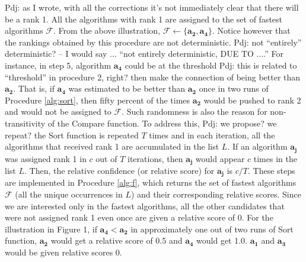 \documentclass[conference]{IEEEtran}
\newcommand{\p}[1]{{\color{blue} Pdj: #1}}
\begin{document}
\p{as I wrote, with all the corrections it's not immediately clear that there will be a rank 1.}
All the algorithms with rank 1 are assigned to the set of fastest algorithms $\mathcal{F}$. From the above illustration,
$\mathcal{F} \leftarrow \{\mathbf{a_2}, \mathbf{a_4}\}$. Notice however that the rankings obtained by this procedure are
not deterministic. \p{not ``entirely'' deterministic? -- I would say ... ``not entirely deterministic, DUE TO ....''}
For instance, in step 5, algorithm $\mathbf{a_4}$ could be at the threshold \p{this is related to ``threshold'' in
  procedure 2, right? then make the connection} of being better than $\mathbf{a_2}$. That is, if $\mathbf{a_4}$ was
estimated to be better than $\mathbf{a_2}$ once in two runs of Procedure \ref{alg:sort}, then fifty percent of the times
$\mathbf{a_2}$ would be pushed to rank 2 and would not be assigned to $\mathcal{F}$. Such randomness is also the reason
for non-transitivity of the Compare function. To address this, \p{we propose? we repeat?} the Sort function is repeated
$T$ times and in each iteration, all the algorithms that received rank 1 are accumulated in the list $L$. If an
algorithm $\mathbf{a_j}$ was assigned rank 1 in $c$ out of $T$ iterations, then $\mathbf{a_j}$ would appear $c$ times in
the list $L$. Then, the relative confidence (or relative score) for $\mathbf{a_j}$ is $c/T$. These steps are implemented
in Procedure \ref{alg:f}, which returns the set of fastest algorithms $\mathcal{F}$ (all the unique occurrences in $L$)
and their corresponding relative scores. Since we are interested only in the fastest algorithms, all the other
candidates that were not assigned rank 1 even once are given a relative score of 0. For the illustration in Figure 1, if $\mathbf{a_4} < \mathbf{a_2}$ in approximately one out of two runs of Sort function, $\mathbf{a_2}$ would get a relative score of 0.5 and $\mathbf{a_4}$ would get 1.0.  $\mathbf{a_1}$ and $\mathbf{a_3}$ would be given relative scores 0.
\end{document}
